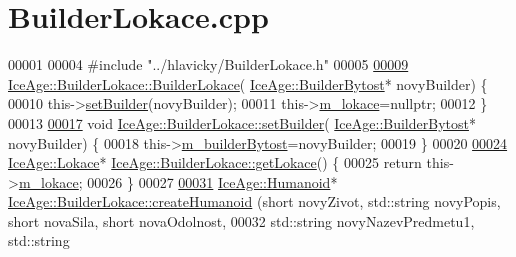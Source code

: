 \hypertarget{BuilderLokace_8cpp_source}{}\section{Builder\+Lokace.\+cpp}
\label{BuilderLokace_8cpp_source}

\begin{DoxyCode}
00001 
00004 \textcolor{preprocessor}{#include "../hlavicky/BuilderLokace.h"}
00005 
\hypertarget{BuilderLokace_8cpp_source.tex_l00009}{}\hyperlink{classIceAge_1_1BuilderLokace_ad8fabba0bddf2d2569c36fa115f40673}{00009} \hyperlink{classIceAge_1_1BuilderLokace_ad8fabba0bddf2d2569c36fa115f40673}{IceAge::BuilderLokace::BuilderLokace}(
      \hyperlink{classIceAge_1_1BuilderBytost}{IceAge::BuilderBytost}* novyBuilder) \{
00010     this->\hyperlink{classIceAge_1_1BuilderLokace_acce53b24cfb8ab5227520e943e6b843b}{setBuilder}(novyBuilder);
00011     this->\hyperlink{classIceAge_1_1BuilderLokace_aad0fb17bf38c03cd767e100758348f24}{m\_lokace}=\textcolor{keyword}{nullptr};
00012 \}
00013 
\hypertarget{BuilderLokace_8cpp_source.tex_l00017}{}\hyperlink{classIceAge_1_1BuilderLokace_acce53b24cfb8ab5227520e943e6b843b}{00017} \textcolor{keywordtype}{void} \hyperlink{classIceAge_1_1BuilderLokace_acce53b24cfb8ab5227520e943e6b843b}{IceAge::BuilderLokace::setBuilder}(
      \hyperlink{classIceAge_1_1BuilderBytost}{IceAge::BuilderBytost}* novyBuilder) \{
00018     this->\hyperlink{classIceAge_1_1BuilderLokace_ac6981c43c22713d56e7ccbefa8b5c8b4}{m\_builderBytost}=novyBuilder;
00019 \}
00020 
\hypertarget{BuilderLokace_8cpp_source.tex_l00024}{}\hyperlink{classIceAge_1_1BuilderLokace_ada96fb10689d0b6f2ed2f7cdc31a171e}{00024} \hyperlink{classIceAge_1_1Lokace}{IceAge::Lokace}* \hyperlink{classIceAge_1_1BuilderLokace_ada96fb10689d0b6f2ed2f7cdc31a171e}{IceAge::BuilderLokace::getLokace}() \{
00025     \textcolor{keywordflow}{return} this->\hyperlink{classIceAge_1_1BuilderLokace_aad0fb17bf38c03cd767e100758348f24}{m\_lokace};
00026 \}
00027 
\hypertarget{BuilderLokace_8cpp_source.tex_l00031}{}\hyperlink{classIceAge_1_1BuilderLokace_abff6ab9c1d0218adfe423f45c8186090}{00031} \hyperlink{classIceAge_1_1Humanoid}{IceAge::Humanoid}* \hyperlink{classIceAge_1_1BuilderLokace_abff6ab9c1d0218adfe423f45c8186090}{IceAge::BuilderLokace::createHumanoid}
      (\textcolor{keywordtype}{short} novyZivot, std::string novyPopis, \textcolor{keywordtype}{short} novaSila, \textcolor{keywordtype}{short} novaOdolnost,
00032                                                      std::string novyNazevPredmetu1, std::string 

\end{DoxyCode}
